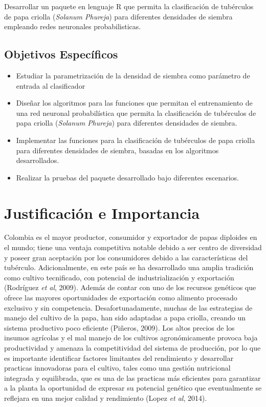 Desarrollar un paquete en lenguaje R que permita la clasificación de tubérculos de papa criolla (\textit{Solanum Phureja}) para diferentes densidades de siembra empleando redes neuronales probabilisticas.

\subsection{Objetivos Específicos}
 
\begin{itemize}
\item{Estudiar la parametrización de la densidad de siembra como parámetro de entrada al clasificador}
\item{Diseñar los algoritmos para las funciones que permitan el entrenamiento de una red neuronal probabilística que permita la clasificación de tubérculos de papa criolla (\textit{Solanum Phureja}) para diferentes densidades de siembra.}
\item{Implementar las funciones  para la clasificación de tubérculos de papa criolla para diferentes densidades de siembra, basadas en los algoritmos desarrollados.}
\item{Realizar la pruebas del paquete desarrollado bajo diferentes escenarios.}
\end{itemize}

\section{Justificación e Importancia}

Colombia es el mayor productor, consumidor y exportador de papas diploides en el mundo; tiene una ventaja competitiva notable debido a ser centro de diversidad y poseer gran aceptación por los consumidores debido a las características del tubérculo. Adicionalmente, en este país se ha desarrollado una amplia tradición como cultivo tecnificado, con potencial de industrialización y exportación (Rodríguez \textit{et al}, 2009). Además de contar con uno de los recursos genéticos que ofrece las mayores oportunidades de exportación como alimento procesado exclusivo y sin competencia. Desafortunadamente, muchas de las estrategias de manejo del cultivo de la papa, han sido adaptadas a papa criolla, creando un sistema productivo poco eficiente (Piñeros, 2009). Los altos precios de los insumos agrícolas y el mal manejo de los cultivos agronómicamente provoca  baja productividad y amenaza la competitividad del sistema de producción, por lo que es importante identificar factores limitantes del rendimiento y desarrollar practicas innovadoras para el cultivo, tales como una gestión nutricional integrada y equilibrada, que es una de las practicas más eficientes para garantizar a la planta la oportunidad de expresar su potencial genético que eventualmente se reflejara en una mejor calidad y rendimiento (Lopez \textit{et al}, 2014).\\
 
